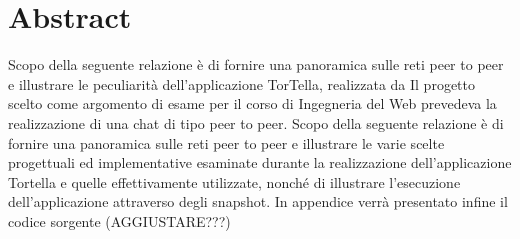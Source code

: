 \chapter*{Abstract}
Scopo della seguente relazione è di fornire una panoramica sulle reti peer to peer e illustrare le peculiarità dell’applicazione TorTella, realizzata da 
Il progetto scelto come argomento di esame per il corso di Ingegneria del Web prevedeva la realizzazione di una chat di tipo peer to peer. Scopo della seguente relazione è di fornire una panoramica sulle reti peer to peer e illustrare le varie scelte progettuali ed implementative esaminate durante la realizzazione dell’applicazione Tortella e quelle effettivamente utilizzate, nonché di illustrare l’esecuzione dell’applicazione attraverso degli snapshot. In appendice verrà presentato infine il codice sorgente (AGGIUSTARE???)